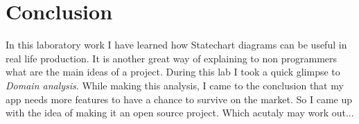 \documentclass{article}
\begin{document}
	\section{Conclusion}
		In this laboratory work I have learned how Statechart diagrams can be useful in real life production. It is another great way of explaining to non programmers what are the main ideas of a project.
		During this lab I took a quick glimpse to \textit{Domain analysis}. While making this analysis, I came to the conclusion that my app needs more features to have a chance to survive on the market. So I came up with the idea of making it an open source project. Which acutaly may work out...
\end{document}
